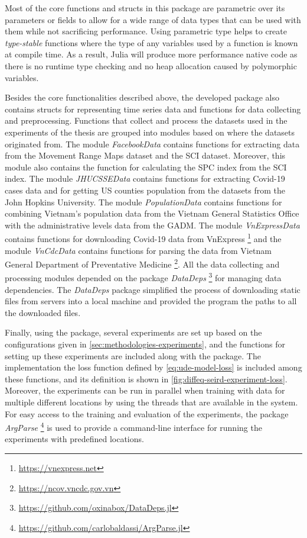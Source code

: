 Most of the core functions and structs in this package are parametric over its parameters or fields to allow for a wide range of data types that can be used with them while not sacrificing performance.
Using parametric type helps to create \textit{type-stable} functions where the type of any variables used by a function is known at compile time.
As a result, Julia will produce more performance native code as there is no runtime type checking and no heap allocation caused by polymorphic variables.

Besides the core functionalities described above, the developed package also contains structs for representing time series data and functions for data collecting and preprocessing.
Functions that collect and process the datasets used in the experiments of the thesis are grouped into modules based on where the datasets originated from.
The module \textit{FacebookData} contains functions for extracting data from the Movement Range Maps dataset and the \gls{SCI} dataset.
Moreover, this module also contains the function for calculating the \gls{SPC} index from the \gls{SCI} index.
The module \textit{JHUCSSEData} contains functions for extracting Covid-19 cases data and for getting \gls{US} counties population from the datasets from the John Hopkins University.
The module \textit{PopulationData} contains functions for combining Vietnam's population data from the Vietnam General Statistics Office with the administrative levels data from the \gls{GADM}.
The module \textit{VnExpressData} contains functions for downloading Covid-19 data from VnExpress \footnote{\url{https://vnexpress.net}} and the module \textit{VnCdcData} contains functions for parsing the data from Vietnam General Department of Preventative Medicine \footnote{\url{https://ncov.vncdc.gov.vn}}.
All the data collecting and processing modules depended on the package \textit{DataDeps} \footnote{\url{https://github.com/oxinabox/DataDeps.jl}} for managing data dependencies.
The \textit{DataDeps} package simplified the process of downloading static files from servers into a local machine and provided the program the paths to all the downloaded files.

Finally, using the package, several experiments are set up based on the configurations given in \autoref{sec:methodologies-experiments}, and the functions for setting up these experiments are included along with the package.
The implementation the loss function defined by \autoref{eq:ude-model-loss} is included among these functions, and its definition is shown in \autoref{fig:diffeq-seird-experiment-loss}.
Moreover, the experiments can be run in parallel when training with data for multiple different locations by using the threads that are available in the system.
For easy access to the training and evaluation of the experiments, the package \textit{ArgParse} \footnote{\url{https://github.com/carlobaldassi/ArgParse.jl}} is used to provide a command-line interface for running the experiments with predefined locations.
